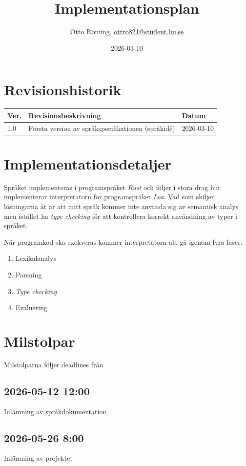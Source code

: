\documentclass{TDP003mall}
\author{Otto Roming, \url{ottro821@student.liu.se}}
\title{Implementationsplan}
\date{2026-03-10}
\begin{document}
\projectpage
\section{Revisionshistorik}
\begin{table}[!h]
\begin{tabularx}{\linewidth}{|l|X|l|}
\hline
Ver. & Revisionsbeskrivning & Datum \\\hline
1.0 & Första version av språkspecifikationen (språkidé) & 2026-03-10 \\\hline
\end{tabularx}
\end{table}

\section{Implementationsdetaljer}
Språket implementeras i programspråket \textit{Rust} och följer i stora drag hur \cite{nystrom_crafting_2021} implementerar interpretatorn för programspråket \textit{Lox}. Vad som skiljer lösningarna åt är att mitt språk kommer inte använda sig av semantisk analys men istället ha \textit{type checking} för att kontrollera korrekt användning av typer i språket. 

När programkod ska exekveras kommer interpretatorn att gå igenom fyra faser.

\begin{enumerate}
    \item Lexikalanalys
    \item Parsning
    \item \textit{Type checking}
    \item Evaluering
\end{enumerate}

\section{Milstolpar}
Milstolparna följer deadlines från \cite{haglund_tdp019_2026}

\subsection{2026-05-12 12:00}
Inlämning av språkdokumentation

\subsection{2026-05-26 8:00}
Inlämning av projektet
\end{document}
